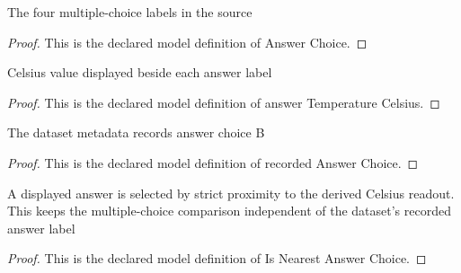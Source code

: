 \begin{definition}
  \label{def:physics:phyx-mini-0346:phyxminiproblems-problemphyxmini0346-answerchoice}
  The four multiple-choice labels in the source
\end{definition}
\begin{proof}
  This is the declared model definition of Answer Choice.
\end{proof}
\begin{definition}
  \label{def:physics:phyx-mini-0346:phyxminiproblems-problemphyxmini0346-answertemperaturecelsius}
  Celsius value displayed beside each answer label
\end{definition}
\begin{proof}
  This is the declared model definition of answer Temperature Celsius.
\end{proof}
\begin{definition}
  \label{def:physics:phyx-mini-0346:phyxminiproblems-problemphyxmini0346-recordedanswerchoice}
  The dataset metadata records answer choice B
\end{definition}
\begin{proof}
  This is the declared model definition of recorded Answer Choice.
\end{proof}
\begin{definition}
  \label{def:physics:phyx-mini-0346:phyxminiproblems-problemphyxmini0346-isnearestanswerchoice}
  A displayed answer is selected by strict proximity to the derived Celsius readout. This keeps the multiple-choice comparison independent of the dataset's recorded answer label
\end{definition}
\begin{proof}
  This is the declared model definition of Is Nearest Answer Choice.
\end{proof}
